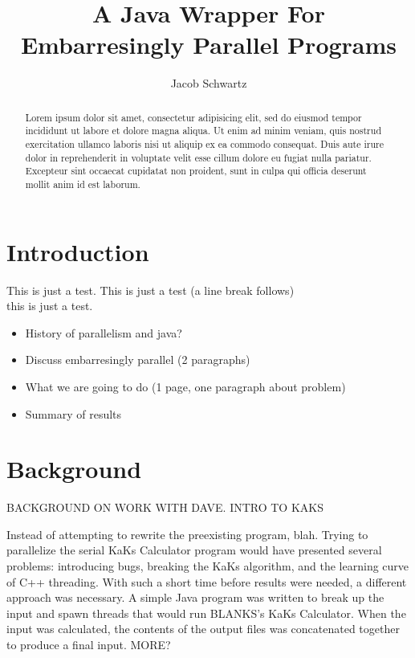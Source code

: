 \documentclass[12pt]{article}
\begin{document}
\title{A Java Wrapper For Embarresingly Parallel Programs}
\author{Jacob Schwartz}
\maketitle

\begin{abstract}
Lorem ipsum dolor sit amet, consectetur adipisicing elit, sed do eiusmod
tempor incididunt ut labore et dolore magna aliqua. Ut enim ad minim
veniam, quis nostrud exercitation ullamco laboris nisi ut aliquip ex ea
commodo consequat. Duis aute irure dolor in reprehenderit in voluptate
velit esse cillum dolore eu fugiat nulla pariatur. Excepteur sint occaecat
cupidatat non proident, sunt in culpa qui officia deserunt mollit anim
id est laborum.
\end{abstract}


\section{Introduction}

This is just a test. This is just a test (a line break follows)\\
this is just a test.

\begin{itemize}
\item History of parallelism and java?
\item Discuss embarresingly parallel (2 paragraphs)
\item What we are going to do (1 page, one paragraph about problem)
\item Summary of results
\end{itemize}

\section{Background}

BACKGROUND ON WORK WITH DAVE. INTRO TO KAKS

Instead of attempting to rewrite the preexisting program, blah. Trying to
parallelize the serial KaKs Calculator program would have presented several
problems: introducing bugs, breaking the KaKs algorithm, and the learning curve
of C++ threading. With such a short time before results were needed, a different
approach was necessary. A simple Java program was written to break up the input
and spawn threads that would run BLANKS's KaKs Calculator. When the input was
calculated, the contents of the output files was concatenated together to
produce a final input. MORE?
\end{document}
